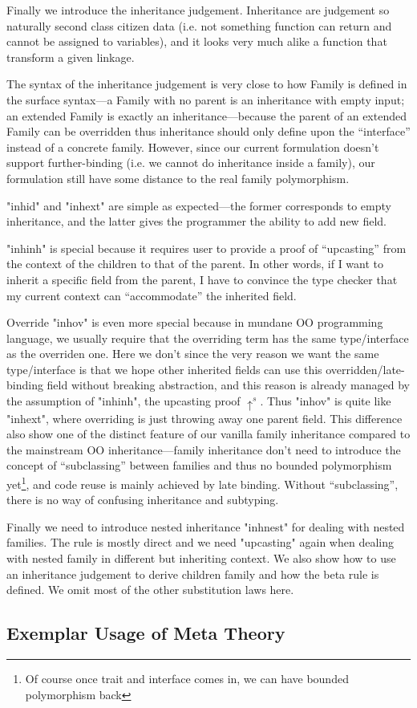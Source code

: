 Finally we introduce the inheritance judgement. Inheritance are judgement so naturally second class citizen data (i.e. not something function can return and cannot be assigned to variables), and it looks very much alike a function that transform a given linkage. 

The syntax of the inheritance judgement is very close to how Family is defined in the surface syntax---a Family with no parent is an inheritance with empty input; an extended Family is exactly an inheritance---because the parent of an extended Family can be overridden thus inheritance should only define upon the ``interface'' instead of a concrete family. However, since our current formulation doesn't support further-binding (i.e. we cannot do inheritance inside a family), our formulation still have some distance to the real family polymorphism. 

"inhid" and "inhext" are simple as expected---the former corresponds to empty inheritance, and the latter gives the programmer the ability to add new field. 

"inhinh" is special because it requires user to provide a proof of ``upcasting'' from the context of the children to that of the parent. In other words, if I want to inherit a specific field from the parent, I have to convince the type checker that my current context can ``accommodate'' the inherited field. 

Override "inhov" is even more special because in mundane OO programming language, we usually require that the overriding term has the same type/interface as the overriden one.  Here we don't since the very reason we want the same type/interface is that we hope other inherited fields can use this overridden/late-binding field without breaking abstraction, and this reason is already managed by the assumption of "inhinh", the upcasting proof $\uparrow^s$. Thus "inhov" is quite like "inhext", where overriding is just throwing away one parent field. This difference also show one of the distinct feature of our vanilla family inheritance compared to the mainstream OO inheritance---family inheritance don't need to introduce the concept of ``subclassing'' between families and thus no bounded polymorphism yet\footnote{Of course once trait and interface comes in, we can have bounded polymorphism back}, and code reuse is mainly achieved by late binding. Without ``subclassing'', there is no way of confusing inheritance and subtyping.

Finally we need to introduce nested inheritance "inhnest" for dealing with nested families. The rule is mostly direct and we need "upcasting" again when dealing with nested family in different but inheriting context.  We also show how to use an inheritance judgement to derive children family and how the beta rule is defined. We omit most of the other substitution laws here.



\subsection{Exemplar Usage of Meta Theory}
